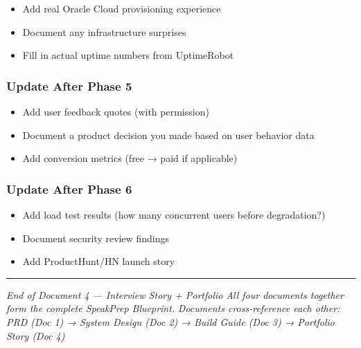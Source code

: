 \documentclass[
  11pt,
]{article}
\providecommand{\tightlist}{%
  \setlength{\itemsep}{0pt}\setlength{\parskip}{0pt}}
\begin{document}
\begin{itemize}
\tightlist
\item[$\square$]
  Add real Oracle Cloud provisioning experience
\item[$\square$]
  Document any infrastructure surprises
\item[$\square$]
  Fill in actual uptime numbers from UptimeRobot
\end{itemize}

\hypertarget{update-after-phase-5}{%
\subsubsection{Update After Phase 5}\label{update-after-phase-5}}

\begin{itemize}
\tightlist
\item[$\square$]
  Add user feedback quotes (with permission)
\item[$\square$]
  Document a product decision you made based on user behavior data
\item[$\square$]
  Add conversion metrics (free → paid if applicable)
\end{itemize}

\hypertarget{update-after-phase-6}{%
\subsubsection{Update After Phase 6}\label{update-after-phase-6}}

\begin{itemize}
\tightlist
\item[$\square$]
  Add load test results (how many concurrent users before degradation?)
\item[$\square$]
  Document security review findings
\item[$\square$]
  Add ProductHunt/HN launch story
\end{itemize}

\begin{center}\rule{0.5\linewidth}{0.5pt}\end{center}

\emph{End of Document 4 --- Interview Story + Portfolio} \emph{All four
documents together form the complete SpeakPrep Blueprint.}
\emph{Documents cross-reference each other: PRD (Doc 1) → System Design
(Doc 2) → Build Guide (Doc 3) → Portfolio Story (Doc 4)}
\end{document}
